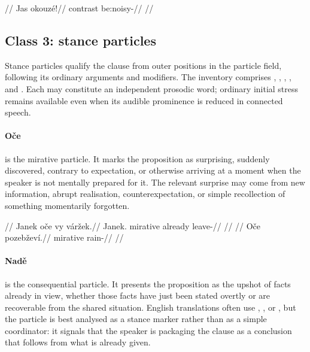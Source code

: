 \pex
\begingl
\glpreamble {}//
\gla Jas okouzé!//
\glb contrast be:noisy-\Proh{}//
\glft {}//
\endgl
\xe

\subsection{Class 3: stance particles}\label{sec:class3-particles}

Stance particles qualify the clause from outer positions in the particle
field, following its ordinary arguments and modifiers. The inventory comprises
, , ,
, and . Each may constitute an independent prosodic
word; ordinary initial stress remains available even when its audible
prominence is reduced in connected speech.

\paragraph{Oče}  is the mirative particle. It marks the proposition
as surprising, suddenly discovered, contrary to expectation, or otherwise
arriving at a moment when the speaker is not mentally prepared for it. The
relevant surprise may come from new information, abrupt realisation,
counterexpectation, or simple recollection of something momentarily forgotten.

\pex
\a
\begingl
\glpreamble {}//
\gla Janek oče vy váržek.//
\glb Janek.\Dir{} mirative already leave-\Pf{}//
\glft {}//
\endgl
\a
\begingl
\glpreamble {}//
\gla Oče pozebževí.//
\glb mirative rain-\Cont{}//
\glft {}//
\endgl
\xe

\paragraph{Nadě}  is the consequential particle. It presents the
proposition as the upshot of facts already in view, whether those facts have
just been stated overtly or are recoverable from the shared situation. English
translations often use , , or , but
the particle is best analysed as a stance marker rather than as a simple
coordinator: it signals that the speaker is packaging the clause as a
conclusion that follows from what is already given.

